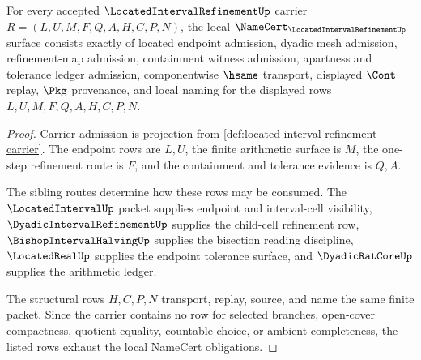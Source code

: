 \begin{theorem}
\label{thm:located-interval-refinement-namecert-obligations}
For every accepted $\LocatedIntervalRefinementUp$ carrier $R=(L,U,M,F,Q,A,H,C,P,N)$, the local $\NameCert_{\LocatedIntervalRefinementUp}$ surface consists exactly of located endpoint admission, dyadic mesh admission, refinement-map admission, containment witness admission, apartness and tolerance ledger admission, componentwise $\hsame$ transport, displayed $\Cont$ replay, $\Pkg$ provenance, and local naming for the displayed rows $L,U,M,F,Q,A,H,C,P,N$.
\end{theorem}
\begin{proof}
Carrier admission is projection from \autoref{def:located-interval-refinement-carrier}. The endpoint rows are $L,U$, the finite arithmetic surface is $M$, the one-step refinement route is $F$, and the containment and tolerance evidence is $Q,A$.

The sibling routes determine how these rows may be consumed. The $\LocatedIntervalUp$ packet supplies endpoint and interval-cell visibility, $\DyadicIntervalRefinementUp$ supplies the child-cell refinement row, $\BishopIntervalHalvingUp$ supplies the bisection reading discipline, $\LocatedRealUp$ supplies the endpoint tolerance surface, and $\DyadicRatCoreUp$ supplies the arithmetic ledger.

The structural rows $H,C,P,N$ transport, replay, source, and name the same finite packet. Since the carrier contains no row for selected branches, open-cover compactness, quotient equality, countable choice, or ambient completeness, the listed rows exhaust the local NameCert obligations.
\end{proof}


\begin{closurestatus}{\LocatedIntervalRefinementUp}
  \theoryclosure{\seedClosure}
  \formalstatus{\unformalizedV}
\end{closurestatus}
